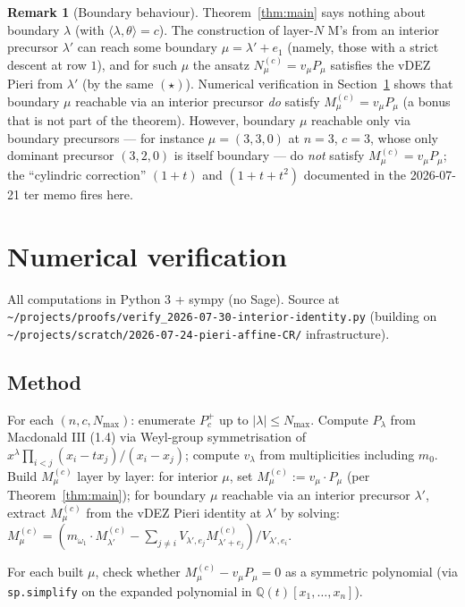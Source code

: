\documentclass[11pt]{article}
\theoremstyle{definition}
\newtheorem{remark}[theorem]{Remark}
\newcommand{\Pcp}{P_c^+}
\newcommand{\Q}{\mathbb{Q}}
\newcommand{\ip}[2]{\langle #1, #2 \rangle}
\begin{document}
\begin{remark}[Boundary behaviour]
Theorem~\ref{thm:main} says nothing about boundary $\lambda$
(with $\ip{\lambda}{\theta} = c$). The construction of layer-$N$ M's from
an interior precursor $\lambda'$ can reach some boundary
$\mu = \lambda' + e_1$ (namely, those with a strict descent at row $1$),
and for such $\mu$ the ansatz $N^{(c)}_\mu = v_\mu P_\mu$ satisfies the
vDEZ Pieri from $\lambda'$ (by the same $(\star)$). Numerical verification
in Section~\ref{sec:verify} shows that boundary $\mu$ reachable via an
interior precursor \emph{do} satisfy $M^{(c)}_\mu = v_\mu P_\mu$ (a bonus
that is not part of the theorem). However, boundary $\mu$ reachable only
via boundary precursors --- for instance $\mu = (3,3,0)$ at $n = 3$,
$c = 3$, whose only dominant precursor $(3,2,0)$ is itself boundary ---
do \emph{not} satisfy $M^{(c)}_\mu = v_\mu P_\mu$; the ``cylindric
correction'' $(1+t)$ and $(1+t+t^2)$ documented in the 2026-07-21 ter
memo \cite{ClioTer} fires here.
\end{remark}

\section{Numerical verification}
\label{sec:verify}

All computations in Python 3 + sympy (no Sage). Source at
\verb|~/projects/proofs/verify_2026-07-30-interior-identity.py|
(building on \verb|~/projects/scratch/2026-07-24-pieri-affine-CR/|
infrastructure).

\subsection{Method}
For each $(n, c, N_{\max})$: enumerate $\Pcp$ up to $|\lambda| \le N_{\max}$.
Compute $P_\lambda$ from Macdonald III (1.4) via
Weyl-group symmetrisation of $x^\lambda \prod_{i<j}(x_i - t x_j)/(x_i - x_j)$;
compute $v_\lambda$ from multiplicities including $m_0$. Build
$M^{(c)}_\mu$ layer by layer: for interior $\mu$, set
$M^{(c)}_\mu := v_\mu \cdot P_\mu$ (per Theorem~\ref{thm:main}); for
boundary $\mu$ reachable via an interior precursor $\lambda'$, extract
$M^{(c)}_\mu$ from the vDEZ Pieri identity at $\lambda'$ by solving:
$M^{(c)}_\mu = (m_{\omega_1}\cdot M^{(c)}_{\lambda'} - \sum_{j\ne i} V_{\lambda',e_j} M^{(c)}_{\lambda'+e_j}) / V_{\lambda',e_i}$.

For each built $\mu$, check whether $M^{(c)}_\mu - v_\mu P_\mu = 0$
as a symmetric polynomial (via \verb|sp.simplify| on the expanded
polynomial in $\Q(t)[x_1,\ldots,x_n]$).
\end{document}
